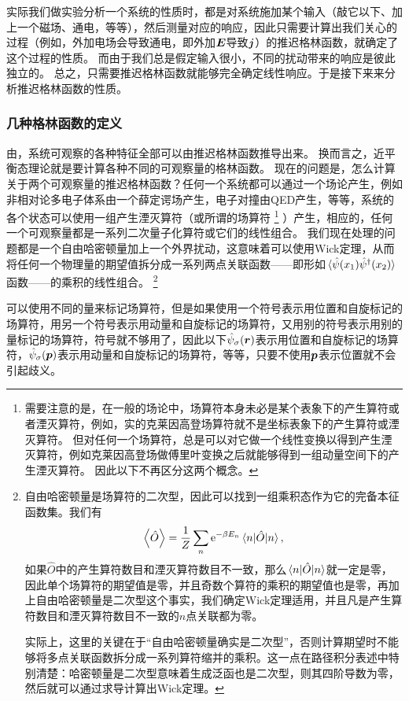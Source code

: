 \documentclass[hyperref, UTF8, a4paper]{ctexart}
\newcommand*{\ee}{\mathrm{e}}
\renewcommand{\autoref}{\prettyref}
\begin{document}
实际我们做实验分析一个系统的性质时，都是对系统施加某个输入（敲它以下、加上一个磁场、通电，等等），然后测量对应的响应，因此只需要计算出我们关心的过程（例如，外加电场会导致通电，即外加$\vb*{E}$导致$\vb*{j}$）的推迟格林函数，就确定了这个过程的性质。
而由于我们总是假定输入很小，不同的扰动带来的响应是彼此独立的。
总之，只需要推迟格林函数就能够完全确定线性响应。于是接下来来分析推迟格林函数的性质。

\subsubsection{几种格林函数的定义}

由\autoref{sec:linear-response}，系统可观察的各种特征全部可以由推迟格林函数推导出来。
换而言之，近平衡态理论就是要计算各种不同的可观察量的格林函数。
现在的问题是，怎么计算关于两个可观察量的推迟格林函数？任何一个系统都可以通过一个场论产生，例如非相对论多电子体系由一个薛定谔场产生，电子对撞由QED产生，等等，系统的各个状态可以使用一组产生湮灭算符（或所谓的场算符%
\footnote{
    需要注意的是，在一般的场论中，场算符本身未必是某个表象下的产生算符或者湮灭算符，例如，实的克莱因高登场算符就不是坐标表象下的产生算符或湮灭算符。
    但对任何一个场算符，总是可以对它做一个线性变换以得到产生湮灭算符，例如克莱因高登场做傅里叶变换之后就能够得到一组动量空间下的产生湮灭算符。
    因此以下不再区分这两个概念。
}%
）产生，相应的，任何一个可观察量都是一系列二次量子化算符或它们的线性组合。
我们现在处理的问题都是一个自由哈密顿量加上一个外界扰动，这意味着可以使用Wick定理，从而将任何一个物理量的期望值拆分成一系列两点关联函数——即形如$\expval*{\hat{\psi}(x_1)\hat{\psi}^\dagger(x_2)}$函数——的乘积的线性组合。%
\footnote{自由哈密顿量是场算符的二次型，因此可以找到一组乘积态作为它的完备本征函数集。我们有
\[
    \expval{\hat{O}} = \frac{1}{Z} \sum_n \ee^{-\beta E_n} \mel{n}{\hat{O}}{n},
\]
如果$\hat{O}$中的产生算符数目和湮灭算符数目不一致，那么$\mel{n}{\hat{O}}{n}$就一定是零，因此单个场算符的期望值是零，并且奇数个算符的乘积的期望值也是零，再加上自由哈密顿量是二次型这个事实，我们确定Wick定理适用，并且凡是产生算符数目和湮灭算符数目不一致的$n$点关联都为零。

实际上，这里的关键在于“自由哈密顿量确实是二次型”，否则计算期望时不能够将多点关联函数拆分成一系列算符缩并的乘积。这一点在路径积分表述中特别清楚：哈密顿量是二次型意味着生成泛函也是二次型，则其四阶导数为零，然后就可以通过求导计算出Wick定理。
}%

可以使用不同的量来标记场算符，但是如果使用一个符号表示用位置和自旋标记的场算符，用另一个符号表示用动量和自旋标记的场算符，又用别的符号表示用别的量标记的场算符，符号就不够用了，因此以下$\hat{\psi}_\sigma(\vb*{r})$表示用位置和自旋标记的场算符，$\hat{\psi}_\sigma(\vb*{p})$表示用动量和自旋标记的场算符，等等，只要不使用$\vb*{p}$表示位置就不会引起歧义。
\end{document}
